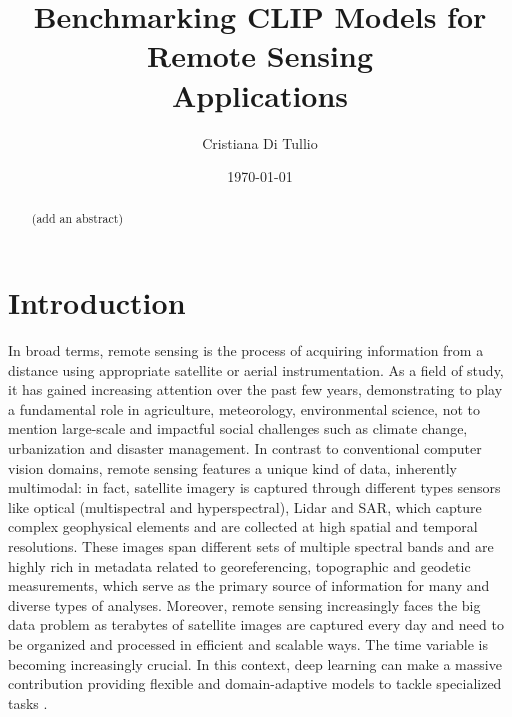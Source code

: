 \documentclass[a4paper, oneside, english]{sapthesis} %
\title{Benchmarking CLIP Models for Remote Sensing \\Applications}
\author{Cristiana Di Tullio}
\date{\today}
\begin{document}
\frontmatter
\maketitle
\dedication{(add a dedication)}

\begin{abstract}
    (add an abstract)
\end{abstract}

\tableofcontents

\mainmatter

\chapter{Introduction} %

In broad terms, remote sensing is the process of acquiring information from a distance using appropriate satellite or aerial instrumentation. As a field of study, it has gained increasing attention over the past few years, demonstrating to play a fundamental role in agriculture, meteorology, environmental science, not to mention large-scale and impactful social challenges such as climate change, urbanization and disaster management. In contrast to conventional computer vision domains, remote sensing features a unique kind of data, inherently multimodal: in fact, satellite imagery is captured through different types sensors like optical (multispectral and hyperspectral), Lidar and SAR, which capture complex geophysical elements and are collected at high spatial and temporal resolutions. These images span different sets of multiple spectral bands and are highly rich in metadata related to georeferencing, topographic and geodetic measurements, which serve as the primary source of information for many and diverse types of analyses. Moreover, remote sensing increasingly faces the big data problem as terabytes of satellite images are captured every day and need to be organized and processed in efficient and scalable ways. The time variable is becoming increasingly crucial. In this context, deep learning can make a massive contribution providing flexible and domain-adaptive models to tackle specialized tasks \cite{zhu2017deep}.
\end{document}

